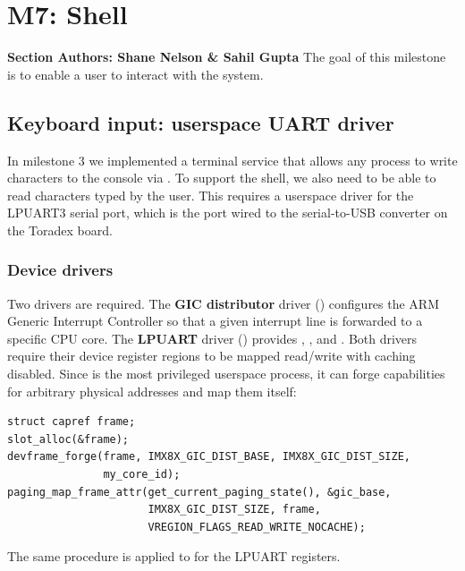 \chapter*{M7: Shell}{\textbf{Section Authors: Shane Nelson \& Sahil Gupta}}
 \newline 
 \newline The goal of this milestone is to enable a user to interact with the system.

\section{Keyboard input: userspace UART driver}

In milestone 3 we implemented a terminal service that allows any process to write
characters to the console via . To support the shell, we also
need to be able to read characters typed by the user. This requires a userspace driver
for the LPUART3 serial port, which is the port wired to the serial-to-USB converter on the
Toradex board.

\subsection{Device drivers}

Two drivers are required. The \textbf{GIC distributor} driver ()
configures the ARM Generic Interrupt Controller so that a given interrupt line is forwarded
to a specific CPU core. The \textbf{LPUART} driver () provides
, ,  and .
Both drivers require their device register regions to be mapped read/write with caching disabled.
Since  is the most privileged userspace process, it can forge  capabilities
for arbitrary physical addresses and map them itself:

\begin{lstlisting}
struct capref frame;
slot_alloc(&frame);
devframe_forge(frame, IMX8X_GIC_DIST_BASE, IMX8X_GIC_DIST_SIZE, 
               my_core_id);
paging_map_frame_attr(get_current_paging_state(), &gic_base,
                      IMX8X_GIC_DIST_SIZE, frame,
                      VREGION_FLAGS_READ_WRITE_NOCACHE);
\end{lstlisting}

\medskip\noindent
The same procedure is applied to  for the LPUART registers.

